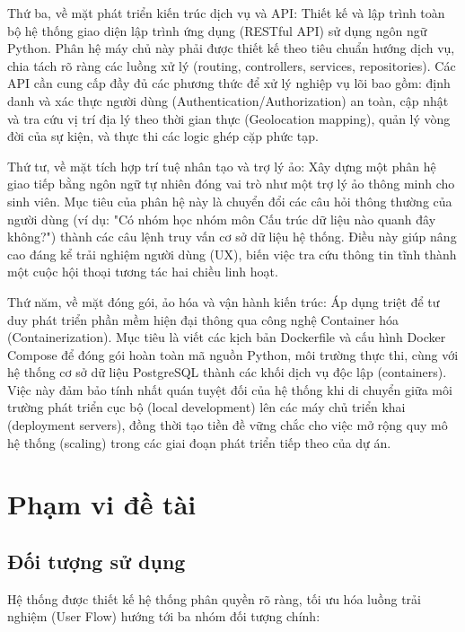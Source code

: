 Thứ ba, về mặt phát triển kiến trúc dịch vụ và API:
Thiết kế và lập trình toàn bộ hệ thống giao diện lập trình ứng dụng (RESTful API) sử dụng ngôn ngữ Python. Phân hệ máy chủ này phải được thiết kế theo tiêu chuẩn hướng dịch vụ, chia tách rõ ràng các luồng xử lý (routing, controllers, services, repositories). Các API cần cung cấp đầy đủ các phương thức để xử lý nghiệp vụ lõi bao gồm: định danh và xác thực người dùng (Authentication/Authorization) an toàn, cập nhật và tra cứu vị trí địa lý theo thời gian thực (Geolocation mapping), quản lý vòng đời của sự kiện, và thực thi các logic ghép cặp phức tạp\cite{fielding2000architectural}.

Thứ tư, về mặt tích hợp trí tuệ nhân tạo và trợ lý ảo:
Xây dựng một phân hệ giao tiếp bằng ngôn ngữ tự nhiên đóng vai trò như một trợ lý ảo thông minh cho sinh viên. Mục tiêu của phân hệ này là chuyển đổi các câu hỏi thông thường của người dùng (ví dụ: "Có nhóm học nhóm môn Cấu trúc dữ liệu nào quanh đây không?") thành các câu lệnh truy vấn cơ sở dữ liệu hệ thống. Điều này giúp nâng cao đáng kể trải nghiệm người dùng (UX), biến việc tra cứu thông tin tĩnh thành một cuộc hội thoại tương tác hai chiều linh hoạt\cite{lewis2020retrieval}.

Thứ năm, về mặt đóng gói, ảo hóa và vận hành kiến trúc:
Áp dụng triệt để tư duy phát triển phần mềm hiện đại thông qua công nghệ Container hóa (Containerization). Mục tiêu là viết các kịch bản Dockerfile và cấu hình Docker Compose để đóng gói hoàn toàn mã nguồn Python, môi trường thực thi, cùng với hệ thống cơ sở dữ liệu PostgreSQL thành các khối dịch vụ độc lập (containers). Việc này đảm bảo tính nhất quán tuyệt đối của hệ thống khi di chuyển giữa môi trường phát triển cục bộ (local development) lên các máy chủ triển khai (deployment servers), đồng thời tạo tiền đề vững chắc cho việc mở rộng quy mô hệ thống (scaling) trong các giai đoạn phát triển tiếp theo của dự án\cite{merkel2014docker}.

\section{Phạm vi đề tài}
\subsection{Đối tượng sử dụng}

Hệ thống được thiết kế hệ thống phân quyền rõ ràng, tối ưu hóa luồng trải nghiệm (User Flow) hướng tới ba nhóm đối tượng chính\cite{sandhu1996role}:

